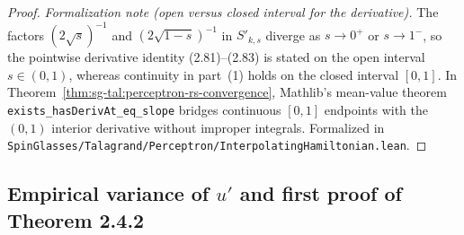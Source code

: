 \begin{proof}
\emph{Formalization note (open versus closed interval for the derivative).} The factors
$(2\sqrt s)^{-1}$ and $(2\sqrt{1-s})^{-1}$ in $S'_{k,s}$ diverge as $s\to 0^+$ or $s\to 1^-$, so
the pointwise derivative identity (2.81)--(2.83) is stated on the open interval $s\in(0,1)$, whereas
continuity in part~(1) holds on the closed interval $[0,1]$. In Theorem~\ref{thm:sg-tal:perceptron-rs-convergence},
Mathlib's mean-value theorem \texttt{exists\_hasDerivAt\_eq\_slope} bridges continuous $[0,1]$
endpoints with the $(0,1)$ interior derivative without improper integrals.
Formalized in \texttt{SpinGlasses/Talagrand/Perceptron/InterpolatingHamiltonian.lean}.
\end{proof}

\subsection{Empirical variance of $u'$ and first proof of Theorem 2.4.2}
\label{sub:sg-tal:perceptron-rs-convergence}

